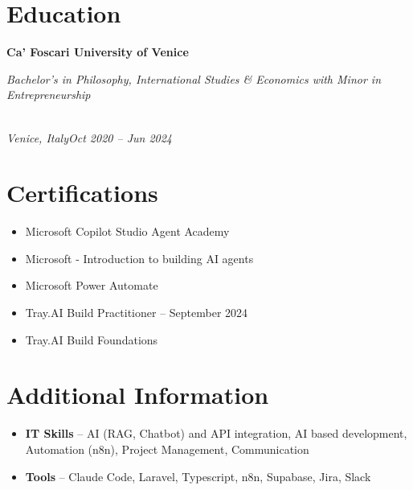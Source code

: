 \documentclass[a4paper,10pt]{article}
\newcommand{\role}[4]{\vspace{3pt}\noindent\hspace{0.6em}\parbox[t]{0.38\textwidth}{\raggedright\textbf{#1}}\hfill\parbox[t]{0.58\textwidth}{\raggedleft\textit{#2}}\\{\textit{#3}\hfill\textit{#4}}\vspace{1pt}}
\begin{document}
\section{Education}
\role{Ca' Foscari University of Venice}{Bachelor's in Philosophy, International Studies \& Economics with Minor in Entrepreneurship}{Venice, Italy}{Oct 2020 -- Jun 2024}

\section{Certifications}
\begin{itemize}
\item Microsoft Copilot Studio Agent Academy
\item Microsoft - Introduction to building AI agents
\item Microsoft Power Automate
\item Tray.AI Build Practitioner -- September 2024
\item Tray.AI Build Foundations
\end{itemize}

\section{Additional Information}
\begin{itemize}
\item \textbf{IT Skills} -- AI (RAG, Chatbot) and API integration, AI based development, Automation (n8n), Project Management, Communication
\item \textbf{Tools} -- Claude Code, Laravel, Typescript, n8n, Supabase, Jira, Slack
\end{itemize}
\end{document}
